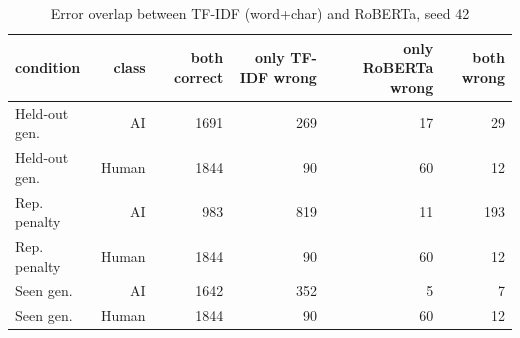 \begin{table}[!t]
\centering
\caption{Error overlap between TF-IDF (word+char) and RoBERTa, seed 42}
\label{tab:error_agreement}
\footnotesize
\begin{tabular}{lrrrrr}
\toprule
\textbf{condition} & \textbf{class} & \textbf{both correct} & \textbf{only TF-IDF wrong} & \textbf{only RoBERTa wrong} & \textbf{both wrong} \\
\midrule
Held-out gen. & AI & 1691 & 269 & 17 & 29 \\
Held-out gen. & Human & 1844 & 90 & 60 & 12 \\
Rep. penalty & AI & 983 & 819 & 11 & 193 \\
Rep. penalty & Human & 1844 & 90 & 60 & 12 \\
Seen gen. & AI & 1642 & 352 & 5 & 7 \\
Seen gen. & Human & 1844 & 90 & 60 & 12 \\
\bottomrule
\end{tabular}
\end{table}
